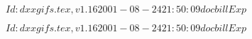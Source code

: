 \documentclass{article}
\begin{document}
$Id: dxxgifs.tex,v 1.16 2001-08-24 21:50:09 docbill Exp $


\pagebreak


$Id: dxxgifs.tex,v 1.16 2001-08-24 21:50:09 docbill Exp $


\pagebreak
\end{document}
